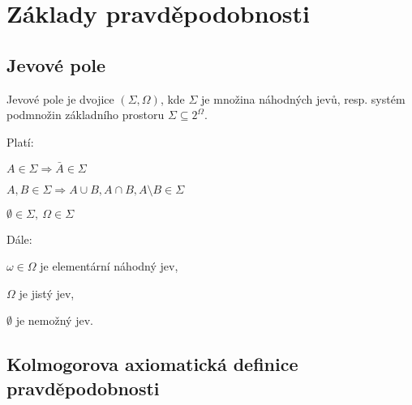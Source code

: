 
\section{Základy pravděpodobnosti}

\subsection{Jevové pole}

\begin{compactitem}
    \item Jevové pole je dvojice $(\Sigma, \Omega)$, kde $\Sigma$ je množina náhodných jevů, resp. systém podmnožin základního prostoru $\Sigma \subseteq 2^{\Omega}$.

    \item Platí: \begin{compactenum}
        \item $ A \in \Sigma \Rightarrow \bar{A} \in \Sigma $
        \item $ A, B \in \Sigma \Rightarrow A \cup B, A \cap B, A \setminus B \in \Sigma $
        \item $ \emptyset \in \Sigma,~ \Omega \in \Sigma $
    \end{compactenum}

    \item Dále: \begin{compactitem}
        \item $\omega \in \Omega$ je elementární náhodný jev,
        \item $\Omega$ je jistý jev,
        \item $\emptyset$ je nemožný jev.
    \end{compactitem}

\end{compactitem}

\subsection{Kolmogorova axiomatická definice pravděpodobnosti}

